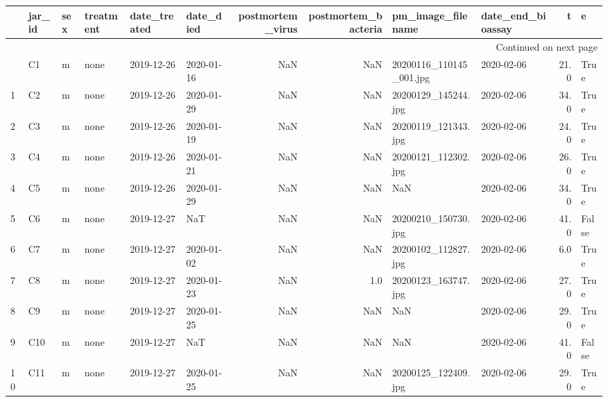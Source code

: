 \begin{longtable}{llllllrrllrl}
\toprule
{} & jar\_id & sex &  treatment & date\_treated &  date\_died &  postmortem\_virus &  postmortem\_bacteria &        pm\_image\_filename & date\_end\_bioassay &     t &      e \\
\midrule
\endhead
\midrule
\multicolumn{12}{r}{{Continued on next page}} \\
\midrule
\endfoot

\bottomrule
\endlastfoot
0  &     C1 &   m &       none &   2019-12-26 & 2020-01-16 &               NaN &                  NaN &  20200116\_110145\_001.jpg &        2020-02-06 &  21.0 &   True \\
1  &     C2 &   m &       none &   2019-12-26 & 2020-01-29 &               NaN &                  NaN &      20200129\_145244.jpg &        2020-02-06 &  34.0 &   True \\
2  &     C3 &   m &       none &   2019-12-26 & 2020-01-19 &               NaN &                  NaN &      20200119\_121343.jpg &        2020-02-06 &  24.0 &   True \\
3  &     C4 &   m &       none &   2019-12-26 & 2020-01-21 &               NaN &                  NaN &      20200121\_112302.jpg &        2020-02-06 &  26.0 &   True \\
4  &     C5 &   m &       none &   2019-12-26 & 2020-01-29 &               NaN &                  NaN &                      NaN &        2020-02-06 &  34.0 &   True \\
5  &     C6 &   m &       none &   2019-12-27 &        NaT &               NaN &                  NaN &      20200210\_150730.jpg &        2020-02-06 &  41.0 &  False \\
6  &     C7 &   m &       none &   2019-12-27 & 2020-01-02 &               NaN &                  NaN &      20200102\_112827.jpg &        2020-02-06 &   6.0 &   True \\
7  &     C8 &   m &       none &   2019-12-27 & 2020-01-23 &               NaN &                  1.0 &      20200123\_163747.jpg &        2020-02-06 &  27.0 &   True \\
8  &     C9 &   m &       none &   2019-12-27 & 2020-01-25 &               NaN &                  NaN &                      NaN &        2020-02-06 &  29.0 &   True \\
9  &    C10 &   m &       none &   2019-12-27 &        NaT &               NaN &                  NaN &                      NaN &        2020-02-06 &  41.0 &  False \\
10 &    C11 &   m &       none &   2019-12-27 & 2020-01-25 &               NaN &                  NaN &      20200125\_122409.jpg &        2020-02-06 &  29.0 &   True \\

\end{longtable}
